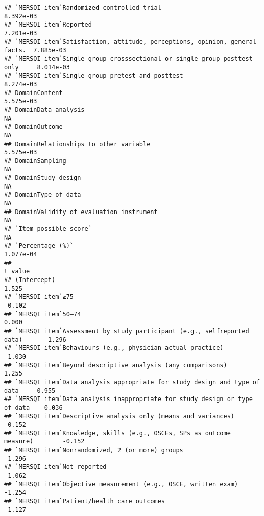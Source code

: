 \documentclass[]{article}
\begin{document}
\begin{verbatim}
## `MERSQI item`Randomized controlled trial                                   8.392e-03
## `MERSQI item`Reported                                                      7.201e-03
## `MERSQI item`Satisfaction, attitude, perceptions, opinion, general facts.  7.885e-03
## `MERSQI item`Single group crosssectional or single group posttest only     8.014e-03
## `MERSQI item`Single group pretest and posttest                             8.274e-03
## DomainContent                                                              5.575e-03
## DomainData analysis                                                               NA
## DomainOutcome                                                                     NA
## DomainRelationships to other variable                                      5.575e-03
## DomainSampling                                                                    NA
## DomainStudy design                                                                NA
## DomainType of data                                                                NA
## DomainValidity of evaluation instrument                                           NA
## `Item possible score`                                                             NA
## `Percentage (%)`                                                           1.077e-04
##                                                                            t value
## (Intercept)                                                                  1.525
## `MERSQI item`≥75                                                            -0.102
## `MERSQI item`50–74                                                           0.000
## `MERSQI item`Assessment by study participant (e.g., selfreported data)      -1.296
## `MERSQI item`Behaviours (e.g., physician actual practice)                   -1.030
## `MERSQI item`Beyond descriptive analysis (any comparisons)                   1.255
## `MERSQI item`Data analysis appropriate for study design and type of data     0.955
## `MERSQI item`Data analysis inappropriate for study design or type of data   -0.036
## `MERSQI item`Descriptive analysis only (means and variances)                -0.152
## `MERSQI item`Knowledge, skills (e.g., OSCEs, SPs as outcome measure)        -0.152
## `MERSQI item`Nonrandomized, 2 (or more) groups                              -1.296
## `MERSQI item`Not reported                                                   -1.062
## `MERSQI item`Objective measurement (e.g., OSCE, written exam)               -1.254
## `MERSQI item`Patient/health care outcomes                                   -1.127

\end{verbatim}
\end{document}
